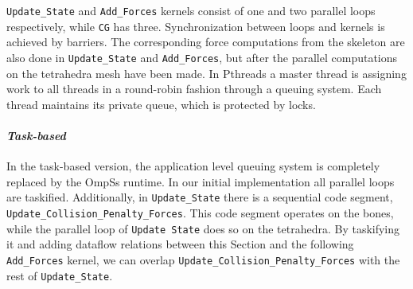{\texttt{Update\_State} and \texttt{Add\_Forces} kernels consist of one and two parallel loops respectively, while \texttt{CG} has three. 
Synchronization between loops and kernels is achieved by barriers.  The corresponding force computations from the skeleton are also done 
in \texttt{Update\_State} and \texttt{Add\_Forces}, but after the parallel computations on the tetrahedra mesh have been made. 
In Pthreads a master thread is assigning work to all threads in a round-robin fashion through a queuing system.  Each thread maintains 
its private queue, which is protected by locks.


\paragraph{\textit{Task-based}}
In the task-based version, the application level queuing system is completely replaced by the OmpSs runtime.  In our initial implementation 
all parallel loops are taskified. 
Additionally,  in \texttt{Update\_State} there is a sequential code segment, 
\texttt{Update\_Collision\_Penalty\_Forces}.  
This code segment operates on the bones, while the parallel loop of \texttt{Update State} does so on the tetrahedra.  
By taskifying it and adding dataflow relations between this Section and the following \texttt{Add\_Forces} kernel, we can overlap 
\texttt{Update\_Collision\_Penalty\_Forces} with the rest of \texttt{Update\_State}.


}
